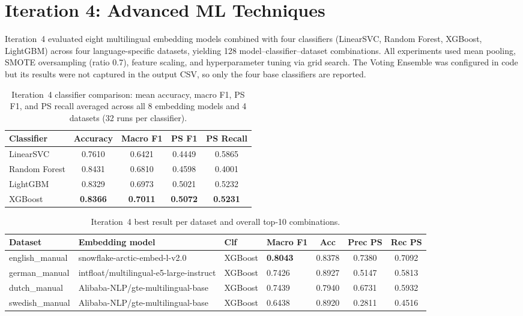 \documentclass[11pt, titlepage, bibliography=totoc]{scrreprt}
\begin{document}
\section{Iteration 4: Advanced ML Techniques}

Iteration~4 evaluated eight multilingual embedding models combined with four classifiers (LinearSVC, Random Forest, XGBoost, LightGBM) across four language-specific datasets, yielding 128 model--classifier--dataset combinations. All experiments used mean pooling, SMOTE oversampling (ratio 0.7), feature scaling, and hyperparameter tuning via grid search. The Voting Ensemble was configured in code but its results were not captured in the output CSV, so only the four base classifiers are reported.

\begin{table}[htbp]
\centering
\caption{Iteration~4 classifier comparison: mean accuracy, macro F1, PS F1, and PS recall averaged across all 8 embedding models and 4 datasets (32 runs per classifier).}
\label{tab:results-iter4-classifiers}
\begin{tabular}{@{}lcccc@{}}
\toprule
\textbf{Classifier} & \textbf{Accuracy} & \textbf{Macro F1} & \textbf{PS F1} & \textbf{PS Recall} \\
\midrule
LinearSVC     & 0.7610 & 0.6421 & 0.4449 & 0.5865 \\
Random Forest & 0.8431 & 0.6810 & 0.4598 & 0.4001 \\
LightGBM      & 0.8329 & 0.6973 & 0.5021 & 0.5232 \\
XGBoost       & \textbf{0.8366} & \textbf{0.7011} & \textbf{0.5072} & \textbf{0.5231} \\
\bottomrule
\end{tabular}
\end{table}

\begin{table}[htbp]
\centering
\caption{Iteration~4 best result per dataset and overall top-10 combinations.}
\label{tab:results-iter4-best}
\begin{tabular}{@{}llllccc@{}}
\toprule
\textbf{Dataset} & \textbf{Embedding model} & \textbf{Clf} & \textbf{Macro F1} & \textbf{Acc} & \textbf{Prec PS} & \textbf{Rec PS} \\
\midrule
english\_manual  & snowflake-arctic-embed-l-v2.0           & XGBoost & \textbf{0.8043} & 0.8378 & 0.7380 & 0.7092 \\
german\_manual   & intfloat/multilingual-e5-large-instruct & XGBoost & 0.7426          & 0.8927 & 0.5147 & 0.5813 \\
dutch\_manual    & Alibaba-NLP/gte-multilingual-base       & XGBoost & 0.7439          & 0.7940 & 0.6731 & 0.5932 \\
swedish\_manual  & Alibaba-NLP/gte-multilingual-base       & XGBoost & 0.6438          & 0.8920 & 0.2811 & 0.4516 \\
\bottomrule
\end{tabular}
\end{table}
\end{document}
